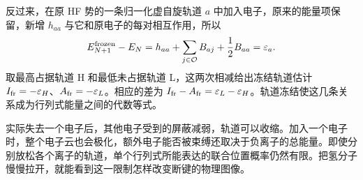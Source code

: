 反过来，在原 HF 势的一条归一化虚自旋轨道 $a$ 中加入电子，原来的能量项保留，新增 $h_{aa}$ 与它和原电子的每对相互作用，所以
\begin{equation}
E_{N+1}^{\rm frozen}-E_N
=h_{aa}+\sum_{j\in\mathcal O}B_{aj}+\frac12B_{aa}
=\varepsilon_a.
\end{equation}
取最高占据轨道 H 和最低未占据轨道 L，这两次相减给出冻结轨道估计 $I_{\rm fr}=-\varepsilon_H$、$A_{\rm fr}=-\varepsilon_L$。相应的差为 $I_{\rm fr}-A_{\rm fr}=\varepsilon_L-\varepsilon_H$。轨道冻结使这几条关系成为行列式能量之间的代数等式。

实际失去一个电子后，其他电子受到的屏蔽减弱，轨道可以收缩。加入一个电子时，整个电子云也会极化，额外电子能否被束缚还取决于负离子的总能量。即使分别放松各个离子的轨道，单个行列式所能表达的联合位置概率仍然有限。把氢分子慢慢拉开，就能看到这一限制怎样改变断键的物理图像。
